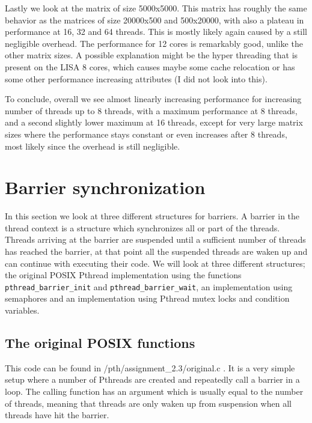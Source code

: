 \documentclass[11pt,a4paper,onecolumn]{article}
\begin{document}
Lastly we look at the matrix of size 5000x5000. This matrix has roughly the same behavior as the matrices of size 20000x500 and 500x20000, with also a plateau in performance at 16, 32 and 64 threads. This is mostly likely again caused by a still negligible overhead. The performance for 12 cores is remarkably good, unlike the other matrix sizes. A possible explanation might be the hyper threading that is present on the LISA 8 cores, which causes maybe some cache relocation or has some other performance increasing attributes (I did not look into this). 

To conclude, overall we see almost linearly increasing performance for increasing number of threads up to 8 threads, with a maximum performance at 8 threads, and a second slightly lower maximum at 16 threads, except for very large matrix sizes where the performance stays constant or even increases after 8 threads, most likely since the overhead is still negligible. 

\section{Barrier synchronization}
In this section we look at three different structures for barriers. A barrier in the thread context is a structure which synchronizes all or part of the threads. Threads arriving at the barrier are suspended until a sufficient number of threads has reached the barrier, at that point all the suspended threads are waken up and can continue with executing their code. We will look at three different structures; the original POSIX Pthread implementation using the functions \texttt{pthread\_barrier\_init} and \texttt{pthread\_barrier\_wait}, an implementation using semaphores and an implementation using Pthread mutex locks and condition variables.

\subsection{The original POSIX functions}
This code can be found in /pth/assignment\_2.3/original.c . It is a very simple setup where a number of Pthreads are created and repeatedly call a barrier in a loop. The calling function has an argument which is usually equal to the number of threads, meaning that threads are only waken up from suspension when all threads have hit the barrier. 
\end{document}
